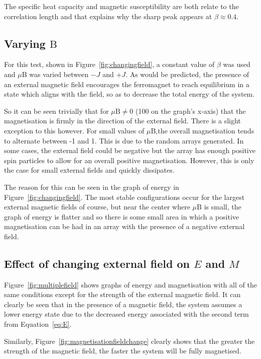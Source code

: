 \documentclass[11pt]{article}
\newcommand{\mathbold}[1]{\boldsymbol{\mathrm{#1}}}
\begin{document}
The specific heat capacity and magnetic susceptibility are both relate to the correlation length and that explains why the sharp peak appears at $\beta \approx 0.4$.

\subsection*{Varying $\mathbold{B}$}
For this test, shown in Figure~\ref{fig:changingfield}, a constant value of $\beta$ was used and $\mu \mathbold{B}$ was varied between $-J$ and $+J$. As would be predicted, the presence of an external magnetic field encourages the ferromagnet to reach equilibrium in a state which aligns with the field, so as to decrease the total energy of the system.

So it can be seen trivially that for $\mu \mathbold{B}\neq 0$ (100 on the graph's x-axis) that the magnetisation is firmly in the direction of the external field. There is a slight exception to this however. For small values of $\mu \mathbold{B}$,the overall magnetisation tends to alternate between -1 and 1. This is due to the random arrays generated. In some cases, the external field could be negative but the array has enough positive spin particles to allow for an overall positive magnetisation. However, this is only the case for small external fields and quickly dissipates.

The reason for this can be seen in the graph of energy in Figure~\ref{fig:changingfield}. The most stable configurations occur for the largest external magnetic fields of course, but near the center where $\mu \mathbold{B}$ is small, the graph of energy is flatter and so there is some small area in which a positive magnetisation can be had in an array with the presence of a negative external field.

\subsection*{Effect of changing external field on $E$ and $M$}
Figure~\ref{fig:multiplefield} shows graphs of energy and magnetisation with all of the same conditions except for the strength of the external magnetic field. It can clearly be seen that in the presence of a magnetic field, the system assumes a lower energy state due to the decreased energy associated with the second term from Equation~\ref{eq:E}.

Similarly, Figure~\ref{fig:magnetisationfieldchange} clearly shows that the greater the strength of the magnetic field, the faster the system will be fully magnetised.
\end{document}
